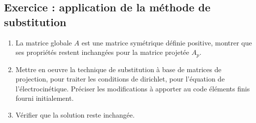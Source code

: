 \documentclass[a4paper, 11pt]{article}
\begin{document}
\subsection{Exercice : application de la méthode de substitution }


\begin{enumerate}[resume]

\item La matrice globale $A$ est une matrice symétrique définie positive, montrer que 
ses propriétés restent inchangées pour la matrice projetée $A_p$.

\item Mettre en oeuvre la technique de substitution à base de matrices de projection,
pour traiter les conditions de dirichlet, pour l'équation de l'électrocinétique.
Préciser les modifications à apporter  au code éléments finis
fourni initialement.

\item Vérifier que la solution reste inchangée.


%



\end{enumerate} 
\end{document}
